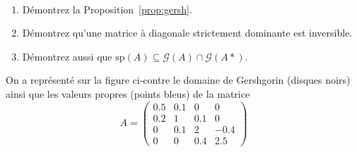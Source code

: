 \begin{exercice}$ $
\begin{enumerate}
\item Démontrez la Proposition~\ref{prop:gersh}.
\item Démontrez qu'une matrice à diagonale strictement dominante est inversible.
\item Démontrez aussi que $\mathrm{sp}(A) \subseteq \mathcal G(A) \cap \mathcal
		G(A*)$.
\end{enumerate}
\end{exercice}

\begin{minipage}{0.45\columnwidth}
On a représenté sur la figure ci-contre le domaine de Gershgorin (disques
noirs) ainsi que les valeurs propres (points bleus) de la matrice
\begin{displaymath}
A = \left(\begin{array}{cccc}
0.5 & 0.1 & 0 & 0\\
0.2 & 1 & 0.1 & 0\\
0 & 0.1& 2 & -0.4 \\
0 & 0 & 0.4 & 2.5
\end{array}\right)
\end{displaymath}
\end{minipage}
\hspace{0.05 \columnwidth}
